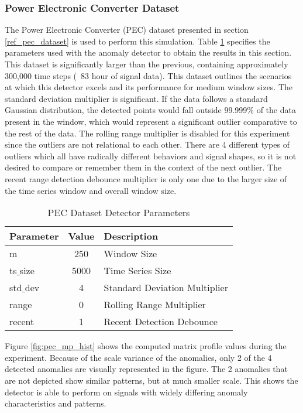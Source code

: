 \subsubsection{Power Electronic Converter Dataset}
\label{ref_results_pec_sim}
The Power Electronic Converter (PEC) dataset presented in section \ref{ref_pec_dataset} is used to perform this simulation. Table \ref{tab:pec_sim_params} specifies the parameters used with the anomaly detector to obtain the results in this section. This dataset is significantly larger than the previous, containing approximately 300,000 time steps (~83 hour of signal data). This dataset outlines the scenarios at which this detector excels and its performance for medium window sizes. The standard deviation multiplier is significant. If the data follows a standard Gaussian distribution, the detected points would fall outside 99.999\% of the data present in the window, which would represent a significant outlier comparative to the rest of the data. The rolling range multiplier is disabled for this experiment since the outliers are not relational to each other. There are 4 different types of outliers which all have radically different behaviors and signal shapes, so it is not desired to compare or remember them in the context of the next outlier. The recent range detection debounce multiplier is only one due to the larger size of the time series window and overall window size.

\begin{table}[H]
\caption{PEC Dataset Detector Parameters}
\begin{tabular}{|l|c|l|}
    \hline
	\textbf{Parameter} & \textbf{Value} & \textbf{Description} \\ \hline
	m & 250 & Window Size \\ \hline
	ts$\_$size & 5000 & Time Series Size \\ \hline
	std$\_$dev & 4 & Standard Deviation Multiplier \\ \hline
	range & 0 & Rolling Range Multiplier\\ \hline
	recent & 1 & Recent Detection Debounce\\ \hline
\end{tabular}
\label{tab:pec_sim_params}
\end{table}

Figure \ref{fig:pec_mp_hist} shows the computed matrix profile values during the experiment. Because of the scale variance of the anomalies, only 2 of the 4 detected anomalies are visually represented in the figure. The 2 anomalies that are not depicted show similar patterns, but at much smaller scale. This shows the detector is able to perform on signals with widely differing anomaly characteristics and patterns.

